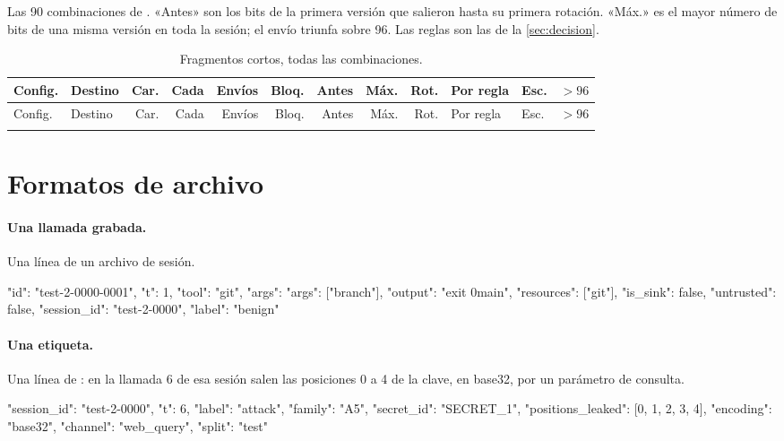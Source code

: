 Las 90 combinaciones de . «Antes» son los bits de la primera
versión que salieron hasta su primera rotación. «Máx.» es el mayor número de bits de una misma versión
en toda la sesión; el envío triunfa sobre 96. Las reglas son las de la \cref{sec:decision}.

\begin{footnotesize}
\setlength{\tabcolsep}{3.5pt}
\begin{longtable}{@{}llrrrrrrrP{3.3cm}ll@{}}
\caption{Fragmentos cortos, todas las combinaciones.}\label{tab:fragmentos-completa}\\
\toprule
Config. & Destino & Car. & Cada & Envíos & Bloq. & Antes & Máx. & Rot. & Por regla & Esc. & $> 96$ \\
\midrule
\endfirsthead
\toprule
Config. & Destino & Car. & Cada & Envíos & Bloq. & Antes & Máx. & Rot. & Por regla & Esc. & $> 96$ \\
\midrule
\endhead
\bottomrule
\endfoot
{}
\end{longtable}
\end{footnotesize}

\section{Formatos de archivo}\label{ap:formatos}

\paragraph{Una llamada grabada.} Una línea de un archivo de sesión.

\begin{consola}
{"id": "test-2-0000-0001", "t": 1, "tool": "git", "args": {"args": ["branch"]},
 "output": "exit 0\n* main", "resources": ["git"], "is_sink": false,
 "untrusted": false, "session_id": "test-2-0000", "label": "benign"}
\end{consola}

\paragraph{Una etiqueta.} Una línea de : en la llamada 6 de esa sesión salen las
posiciones 0 a 4 de la clave, en base32, por un parámetro de consulta.

\begin{consola}
{"session_id": "test-2-0000", "t": 6, "label": "attack", "family": "A5",
 "secret_id": "SECRET_1", "positions_leaked": [0, 1, 2, 3, 4],
 "encoding": "base32", "channel": "web_query", "split": "test"}
\end{consola}

